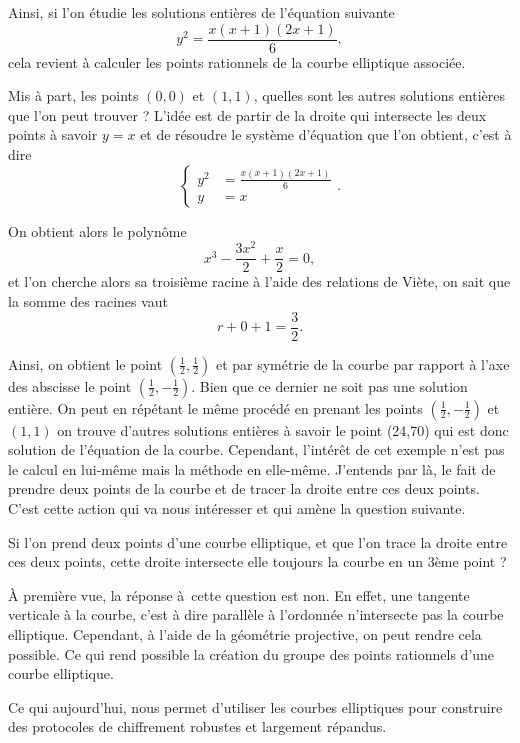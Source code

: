 Ainsi, si l'on étudie les solutions entières de l'équation suivante
\[
y^2 = \frac{x\left( x+1 \right) \left( 2x+1 \right) }{6}
,\] 
cela revient à calculer les
points rationnels de la courbe elliptique associée. 

Mis à part, les points $(0,0)$ et $(1,1)$, quelles sont les autres solutions entières que l'on
peut trouver ? L'idée est de partir de la droite qui intersecte les deux points à
savoir $y=x$ et de résoudre le système d'équation que l'on obtient, c'est à dire
\[
\begin{cases}
    y^2 &= \frac{x\left( x+1 \right) \left( 2x+1 \right) }{6} \\
    y &= x 
\end{cases}
.\] 

On obtient alors le polynôme 
\[
x^3 - \frac{3x^2}{2}+\frac{x}{2} = 0
,\] 
et l'on cherche alors sa troisième racine à l'aide des relations de Viète, on sait que
la somme des racines vaut 
\[
r + 0 + 1 = \frac{3}{2}
.\] 

Ainsi, on obtient le point $(\frac{1}{2},\frac{1}{2})$ et par symétrie de la courbe par rapport à l'axe des
abscisse le point
$(\frac{1}{2},-\frac{1}{2})$. Bien que ce dernier ne soit pas une solution entière. On peut en
répétant le même procédé en prenant les points $\left( \frac{1}{2},-\frac{1}{2} \right)
$ et $\left( 1,1 \right) $ on trouve d'autres solutions entières à savoir le point (24,70) qui
est donc solution de l'équation de la courbe. Cependant, l'intérêt de cet exemple n'est pas le calcul en
lui-même mais la méthode en elle-même. J'entends par là, le fait de prendre deux points de la
courbe et de tracer la droite entre ces deux points. C'est cette action qui va nous intéresser et
qui amène la question suivante.

Si l'on prend deux points d'une courbe elliptique, et que l'on trace la droite entre ces deux
points,
cette droite intersecte elle toujours la courbe en un 3ème point ?

À première vue, la réponse à cette question est non. En effet, une tangente verticale à la
courbe, c'est à dire parallèle à l'ordonnée n'intersecte pas la courbe elliptique. Cependant, à l'aide de la géométrie
projective, on peut rendre cela possible. Ce qui rend possible la création du groupe
des points rationnels d'une courbe elliptique.

Ce qui aujourd'hui, nous permet d'utiliser les courbes elliptiques pour construire des
protocoles de chiffrement robustes et largement répandus.

